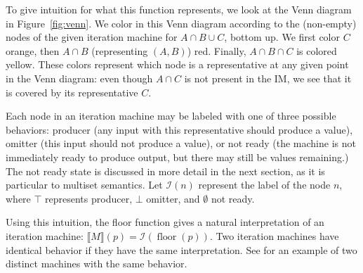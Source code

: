 \documentclass[acmsmall,screen,nonacm]{acmart}\settopmatter{printfolios=true,printccs=false,printacmref=false}
\DeclareMathOperator{\floor}{floor}
\newcommand*{\interp}{\mathcal{I}}
\begin{document}
To give intuition for what this function represents,
we look at the Venn diagram in Figure~\ref{fig:venn}.
We color in this Venn diagram according to the (non-empty) nodes
of the given iteration machine for $A \cap B \cup C$, bottom up.
We first color $C$ orange, then $A \cap B$ (representing $(A, B)$)
red. Finally, $A \cap B \cap C$ is colored yellow. These colors
represent which node is a representative at any given point in the
Venn diagram: even though $A \cap C$ is not present in the IM,
we see that it is covered by its representative $C$.

Each node in an iteration machine may be labeled with one of three
possible behaviors: producer (any input with this representative
should produce a value), omitter (this input should not produce a value),
or not ready (the machine is not immediately ready to produce output,
but there may still be values remaining.) The not ready state is
discussed in more detail in the next section, as it is particular
to multiset semantics. Let $\interp(n)$ represent the label of the node $n$,
where $\top$ represents producer, $\bot$ omitter, and $\emptyset$
not ready.

Using this intuition, the floor function gives a natural
interpretation of an iteration machine:
    $\lBrack M \rBrack(p) = \interp(\floor(p)).$
Two iteration machines have identical behavior if they have the same
interpretation. See  for an example of two distinct machines with the same behavior.
\end{document}
